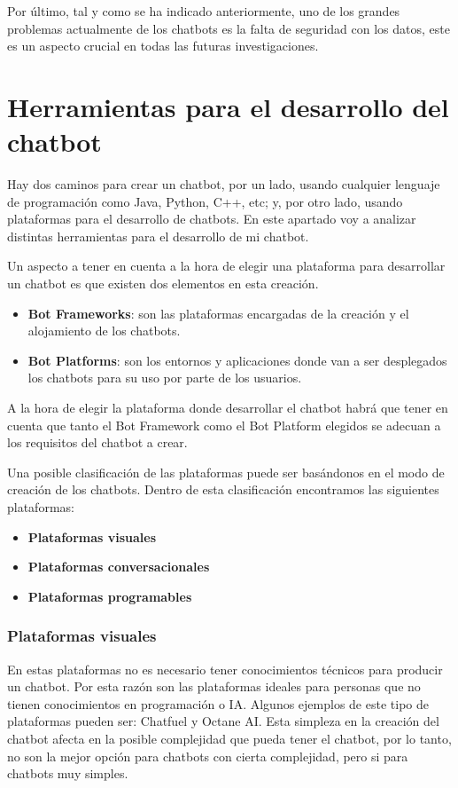 Por último, tal y como se ha indicado anteriormente, uno de los grandes problemas actualmente de los chatbots es la falta de seguridad con los datos, este es un aspecto crucial en todas las futuras investigaciones.

\section{Herramientas para el desarrollo del chatbot}

Hay dos caminos para crear un chatbot, por un lado, usando cualquier lenguaje de programación como Java, Python, C++, etc; y, por otro lado, usando plataformas para el desarrollo de chatbots. En este apartado voy a analizar distintas herramientas para el desarrollo de mi chatbot.

Un aspecto a tener en cuenta a la hora de elegir una plataforma para desarrollar un chatbot es que existen dos elementos en esta creación.

\begin{itemize}
\item \textbf{Bot Frameworks}: son las plataformas encargadas de la creación y el alojamiento de los chatbots.
\item \textbf{Bot Platforms}: son los entornos y aplicaciones donde van a ser desplegados los chatbots para su uso por parte de los usuarios.
\end{itemize}

A la hora de elegir la plataforma donde desarrollar el chatbot habrá que tener en cuenta que tanto el Bot Framework como el Bot Platform elegidos se adecuan a los requisitos del chatbot a crear.

Una posible clasificación de las plataformas puede ser basándonos en el modo de creación de los chatbots. Dentro de esta clasificación encontramos las siguientes plataformas:

\begin{itemize}
\item \textbf{Plataformas visuales}
\item \textbf{Plataformas conversacionales}
\item \textbf{Plataformas programables}
\end{itemize}

\subsubsection*{Plataformas visuales}

En estas plataformas no es necesario tener conocimientos técnicos para producir un chatbot. Por esta razón son las plataformas ideales para personas que no tienen conocimientos en programación o \gls{IA}. Algunos ejemplos de este tipo de plataformas pueden ser: Chatfuel y Octane AI. Esta simpleza en la creación del chatbot afecta en la posible complejidad que pueda tener el chatbot, por lo tanto, no son la mejor opción para chatbots con cierta complejidad, pero si para chatbots muy simples.

